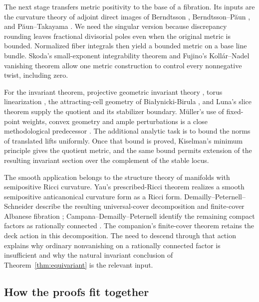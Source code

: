 The next stage transfers metric positivity to the base of a fibration. Its inputs are the curvature theory of adjoint direct images of Berndtsson \cite{Berndtsson2009}, Berndtsson--P\u{a}un \cite{BerndtssonPaun2008}, and P\u{a}un--Takayama \cite{PaunTakayama2018}. We need the singular version because discrepancy rounding leaves fractional divisorial poles even when the original metric is bounded. Normalized fiber integrals then yield a bounded metric on a base line bundle. Skoda's small-exponent integrability theorem \cite{Skoda1972} and Fujino's Koll\'ar--Nadel vanishing theorem \cite[Theorem~1.3]{Fujino2018} allow one metric construction to control every nonnegative twist, including zero.

For the invariant theorem, projective geometric invariant theory \cite{MFK1994}, torus linearization \cite{Sumihiro1974,KKLV1989}, the attracting-cell geometry of Bia\l{}ynicki-Birula \cite{BB1973}, and Luna's slice theorem \cite{Luna1973} supply the quotient and its stabilizer boundary. M\"uller's use of fixed-point weights, convex geometry and ample perturbations is a close methodological predecessor \cite{Muller2025}. The additional analytic task is to bound the norms of translated lifts uniformly. Once that bound is proved, Kiselman's minimum principle \cite{Kiselman1978,DWZZ2018} gives the quotient metric, and the same bound permits extension of the resulting invariant section over the complement of the stable locus.

The smooth application belongs to the structure theory of manifolds with semipositive Ricci curvature. Yau's prescribed-Ricci theorem \cite{Yau1978} realizes a smooth semipositive anticanonical curvature form as a Ricci form. Demailly--Peternell--Schneider describe the resulting universal-cover decomposition and finite-cover Albanese fibration \cite[Structure Theorem, p.~218]{DPS1996}; Campana--Demailly--Peternell identify the remaining compact factors as rationally connected \cite[Theorem~1.4]{CDP2015}. The companion's finite-cover theorem retains the deck action in this decomposition. The need to descend through that action explains why ordinary nonvanishing on a rationally connected factor is insufficient and why the natural invariant conclusion of Theorem~\ref{thm:equivariant} is the relevant input.

\subsection{How the proofs fit together}

